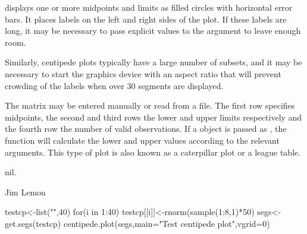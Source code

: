 \begin{Details}\relax
{} displays one or more midpoints and limits as 
filled circles with horizontal error bars. It places labels on the left and
right sides of the plot. If these labels are long, it may be necessary to
pass explicit values to the  argument to leave enough room.

Similarly, centipede plots typically have a large number of subsets, and 
it may be necessary to start the graphics device with an aspect ratio that
will prevent crowding of the labels when over 30 segments are displayed.

The matrix  may be entered manually or read from a file.
The first row specifies midpoints, the second and third rows the lower
and upper limits respectively and the fourth row the number of valid
observations. If a  object is passed as , the
function will calculate the lower and upper
values according to the relevant arguments. This type of plot is also
known as a caterpillar plot or a league table.
\end{Details}
\begin{Value}
nil.
\end{Value}
\begin{Author}\relax
Jim Lemon
\end{Author}
\begin{SeeAlso}\relax
{}
\end{SeeAlso}
\begin{Examples}
\begin{ExampleCode}
 testcp<-list("",40)
 for(i in 1:40) testcp[[i]]<-rnorm(sample(1:8,1)*50)
 segs<-get.segs(testcp)
 centipede.plot(segs,main="Test centipede plot",vgrid=0)
\end{ExampleCode}
\end{Examples}

